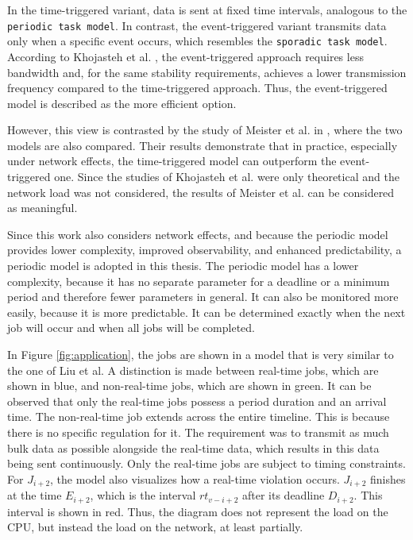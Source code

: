 In the time-triggered variant, data is sent at fixed time intervals, analogous to the \texttt{periodic task model}.  
In contrast, the event-triggered variant transmits data only when a specific event occurs, which resembles the \texttt{sporadic task model}.  
According to Khojasteh et al. \cite[p.~6]{khojasteh2017timetriggeringversuseventtriggeringcontrol}, the event-triggered approach requires less bandwidth and, for the same stability requirements, achieves a lower transmission frequency compared to the time-triggered approach.  
Thus, the event-triggered model is described as the more efficient option.  

However, this view is contrasted by the study of Meister et al. in \cite{meister2023sharednetworkeffectstime}, where the two models are also compared.  
Their results demonstrate that in practice, especially under network effects, the time-triggered model can outperform the event-triggered one.  
Since the studies of Khojasteh et al. were only theoretical and the network load was not considered, the results of Meister et al. can be considered as meaningful.

Since this work also considers network effects, and because the periodic model provides lower complexity, improved observability, and enhanced predictability, a periodic model is adopted in this thesis.  
The periodic model has a lower complexity, because it has no separate parameter for a deadline or a minimum period and therefore fewer parameters in general.
It can also be monitored more easily, because it is more predictable.  
It can be determined exactly when the next job will occur and when all jobs will be completed.  

In Figure \ref{fig:application}, the jobs are shown in a model that is very similar to the one of Liu et al.  
A distinction is made between real-time jobs, which are shown in blue, and non-real-time jobs, which are shown in green.  
It can be observed that only the real-time jobs possess a period duration and an arrival time.  
The non-real-time job extends across the entire timeline.  
This is because there is no specific regulation for it.  
The requirement was to transmit as much bulk data as possible alongside the real-time data, which results in this data being sent continuously.  
Only the real-time jobs are subject to timing constraints.  
For $J_{i+2}$, the model also visualizes how a real-time violation occurs.  
$J_{i+2}$ finishes at the time $E_{i+2}$, which is the interval $rt_{v-i+2}$ after its deadline $D_{i+2}$.  
This interval is shown in red.  
Thus, the diagram does not represent the load on the \ac{CPU}, but instead the load on the network, at least partially.  

